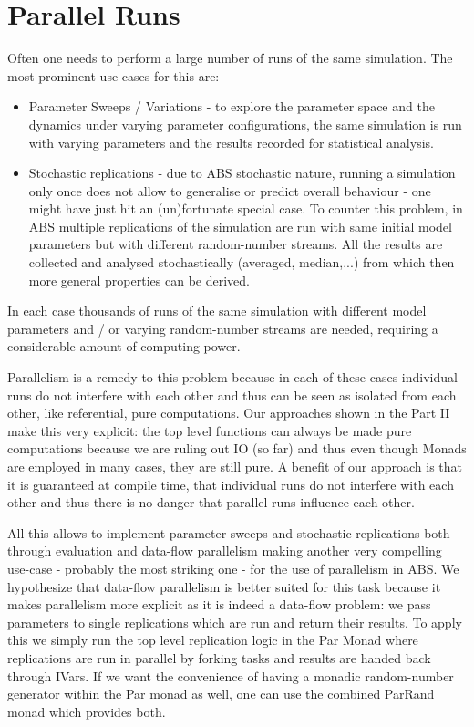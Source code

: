 \section{Parallel Runs}
Often one needs to perform a large number of runs of the same simulation. The most prominent use-cases for this are:

\begin{itemize}
	\item Parameter Sweeps / Variations - to explore the parameter space and the dynamics under varying parameter configurations, the same simulation is run with varying parameters and the results recorded for statistical analysis.
	
	\item Stochastic replications - due to ABS stochastic nature, running a simulation only once does not allow to generalise or predict overall behaviour - one might have just hit an (un)fortunate special case. To counter this problem, in ABS multiple replications of the  simulation are run with same initial model parameters but with different random-number streams. All the results are collected and analysed stochastically (averaged, median,...) from which then more general properties can be derived.
\end{itemize}

In each case thousands of runs of the same simulation with different model parameters and / or varying random-number streams are needed, requiring a considerable amount of computing power.

Parallelism is a remedy to this problem because in each of these cases individual runs do not interfere with each other and thus can be seen as isolated from each other, like referential, pure computations. Our approaches shown in the Part II make this very explicit: the top level functions can always be made pure computations because we are ruling out IO (so far) and thus even though Monads are employed in many cases, they are still pure. A benefit of our approach is that it is guaranteed at compile time, that individual runs do not interfere with each other and thus there is no danger that parallel runs influence each other. 

All this allows to implement parameter sweeps and stochastic replications both through evaluation and data-flow parallelism making another very compelling use-case - probably the most striking one - for the use of parallelism in ABS. We hypothesize that data-flow parallelism is better suited for this task because it makes parallelism more explicit as it is indeed a data-flow problem: we pass parameters to single replications which are run and return their results. To apply this we simply run the top level replication logic in the Par Monad where replications are run in parallel by forking tasks and results are handed back through IVars. If we want the convenience of having a monadic random-number generator within the Par monad as well, one can use the combined ParRand monad which provides both.